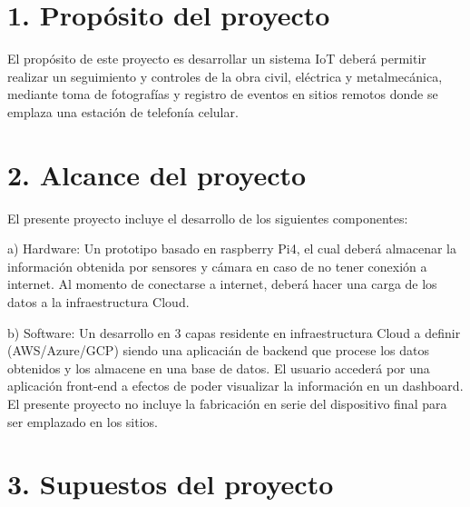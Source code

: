 \documentclass[11pt]{charter}
\begin{document}
\section{1. Propósito del proyecto}
\label{sec:proposito}

\begin{consigna}

El propósito de este proyecto es desarrollar un sistema IoT deberá permitir realizar un seguimiento y controles de la obra civil, eléctrica y metalmecánica, mediante toma de fotografías y registro de eventos en sitios remotos donde se emplaza una estación de telefonía celular.
\end{consigna}

\section{2. Alcance del proyecto}
\label{sec:alcance}

\begin{consigna}

El presente proyecto incluye el desarrollo de los siguientes componentes:
\item a) Hardware: Un prototipo basado en raspberry Pi4, el cual deberá almacenar la información obtenida por sensores y cámara en caso de no tener conexión a internet. Al momento de  conectarse a internet, deberá hacer una carga de los datos a la infraestructura Cloud.
\item b) Software: Un desarrollo en 3 capas residente en infraestructura Cloud a definir (AWS/Azure/GCP) siendo una aplicacián de backend que procese los datos obtenidos y los almacene en una base de datos.
El usuario accederá por una aplicación front-end a efectos de poder visualizar la información en un dashboard. 
El presente proyecto no incluye la fabricación en serie del dispositivo final para ser emplazado en los sitios.

\end{consigna}


\section{3. Supuestos del proyecto}
\label{sec:supuestos}
\end{document}
